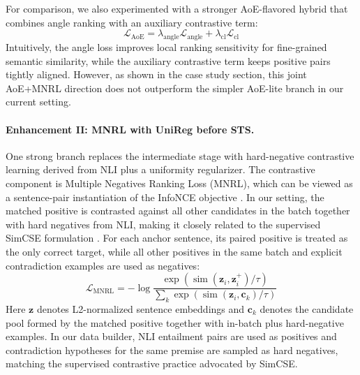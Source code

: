 \documentclass[letterpaper]{article} %
\begin{document}
For comparison, we also experimented with a stronger AoE-flavored hybrid that combines angle ranking
with an auxiliary contrastive term:
\begin{equation}
\mathcal{L}_{\text{AoE}}=\lambda_{\text{angle}}\mathcal{L}_{\text{angle}}+\lambda_{\text{cl}}\mathcal{L}_{\text{cl}}
\end{equation}
Intuitively, the angle loss improves local ranking sensitivity for fine-grained semantic similarity,
while the auxiliary contrastive term keeps positive pairs tightly aligned. However, as shown in the
case study section, this joint AoE+MNRL direction does not outperform the simpler AoE-lite branch in
our current setting.

\paragraph{Enhancement II: MNRL with UniReg before STS.}
One strong branch replaces the intermediate stage with hard-negative contrastive learning derived from NLI plus a
uniformity regularizer. The contrastive component is Multiple Negatives Ranking Loss (MNRL), which
can be viewed as a sentence-pair instantiation of the InfoNCE objective
\cite{rusak2025infonce}. In our setting, the matched positive is contrasted against all other
candidates in the batch together with hard negatives from NLI, making it closely related to the
supervised SimCSE formulation \cite{gao-etal-2021-simcse}. For each anchor sentence, its paired
positive is treated as the only correct target, while all other positives in the same batch and
explicit contradiction examples are used as negatives:
\begin{equation}
\mathcal{L}_{\text{MNRL}}=
-\log\frac{\exp(\operatorname{sim}(\mathbf{z}_i,\mathbf{z}_i^+)/\tau)}
{\sum_{k}\exp(\operatorname{sim}(\mathbf{z}_i,\mathbf{c}_k)/\tau)}
\end{equation}
Here $\mathbf{z}$ denotes L2-normalized sentence embeddings and $\mathbf{c}_k$ denotes the candidate
pool formed by the matched positive together with in-batch plus hard-negative examples. In our data
builder, NLI entailment pairs are used as positives and contradiction hypotheses for the same premise
are sampled as hard negatives, matching the supervised contrastive practice advocated by SimCSE.
\end{document}

